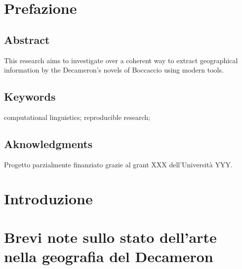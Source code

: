 \section{Prefazione}\label{prefazione}

\subsection{Abstract}\label{abstract}

This research aims to investigate over a coherent way to extract
geographical information by the Decameron's novels of Boccaccio using
modern tools.

\subsection{Keywords}\label{keywords}

computational linguistics; reproducible research;

\subsection{Aknowledgments}\label{aknowledgments}

Progetto parzialmente finanziato grazie al grant XXX dell'Università
YYY.

\section{Introduzione}\label{introduzione}

\section{Brevi note sullo stato dell'arte nella geografia del
Decameron}\label{brevi-note-sullo-stato-dellarte-nella-geografia-del-decameron}

